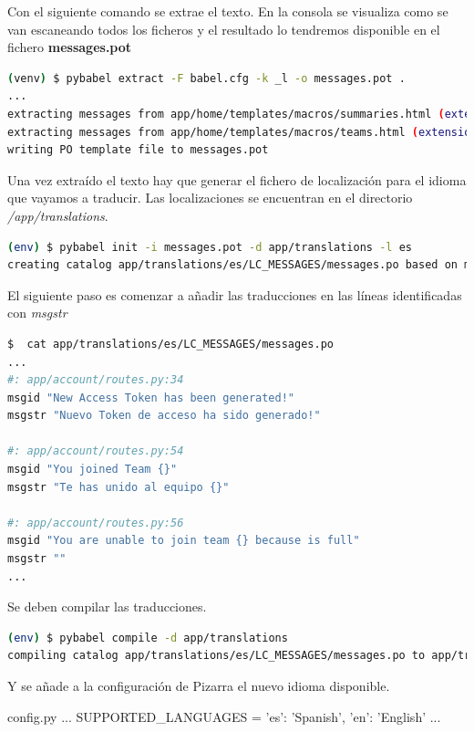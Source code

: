 \documentclass[11pt,spanish,listoffigures,listoftables]{tfgetsinf}
\begin{document}
Con el siguiente comando se extrae el texto. En la consola se visualiza como se van escaneando todos los ficheros y el resultado lo tendremos disponible en el fichero \mbox{\textbf{messages.pot}} 

\begin{lstlisting}[language=bash]
(venv) $ pybabel extract -F babel.cfg -k _l -o messages.pot .
...
extracting messages from app/home/templates/macros/summaries.html (extensions="jinja2.ext.autoescape,jinja2.ext.with_")
extracting messages from app/home/templates/macros/teams.html (extensions="jinja2.ext.autoescape,jinja2.ext.with_")
writing PO template file to messages.pot
\end{lstlisting}

Una vez extraído el texto hay que generar el fichero de localización para el idioma que vayamos a traducir. Las localizaciones se encuentran en el directorio \textit{/app/translations}. 

\begin{lstlisting}[language=bash]
(env) $ pybabel init -i messages.pot -d app/translations -l es
creating catalog app/translations/es/LC_MESSAGES/messages.po based on messages.pot
\end{lstlisting}

El siguiente paso es comenzar a añadir las traducciones en las líneas identificadas con \textit{msgstr}

\begin{lstlisting}[language=bash]
$  cat app/translations/es/LC_MESSAGES/messages.po
...
#: app/account/routes.py:34
msgid "New Access Token has been generated!"
msgstr "Nuevo Token de acceso ha sido generado!"

#: app/account/routes.py:54
msgid "You joined Team {}"
msgstr "Te has unido al equipo {}"

#: app/account/routes.py:56
msgid "You are unable to join team {} because is full"
msgstr ""
...
\end{lstlisting}

Se deben compilar las traducciones.

\begin{lstlisting}[language=bash]
(env) $ pybabel compile -d app/translations
compiling catalog app/translations/es/LC_MESSAGES/messages.po to app/translations/es/LC_MESSAGES/messages.mo
\end{lstlisting}

Y se añade a la configuración de Pizarra el nuevo idioma disponible.

\begin{code}{config.py}
	...
	SUPPORTED_LANGUAGES = {'es': 'Spanish', 'en': 'English'}
	...
\end{code}
\end{document}
